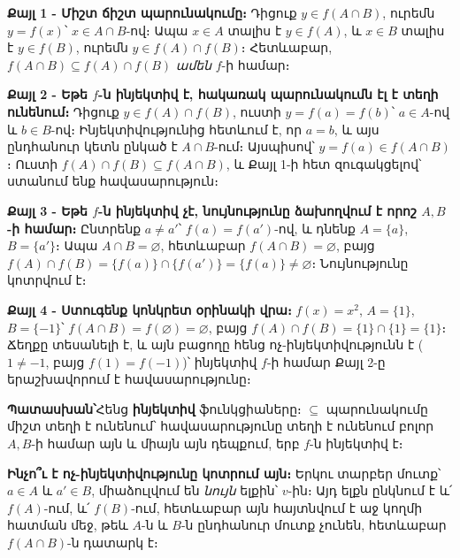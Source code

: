 \documentclass[11pt,a4paper]{article}
\newcommand{\answer}[1]{\begin{answerbox}\centering\textbf{Պատասխան՝}\quad #1\end{answerbox}}
\begin{document}
\textbf{Քայլ 1 - Միշտ ճիշտ պարունակումը։} Դիցուք $y\in f(A\cap B)$, ուրեմն $y=f(x)$՝ $x\in A\cap B$-ով։
Ապա $x\in A$ տալիս է $y\in f(A)$, և $x\in B$ տալիս է $y\in f(B)$, ուրեմն $y\in f(A)\cap f(B)$։
Հետևաբար, $f(A\cap B)\subseteq f(A)\cap f(B)$ \emph{ամեն} $f$-ի համար։

\textbf{Քայլ 2 - Եթե $f$-ն ինյեկտիվ է, հակառակ պարունակումն էլ է տեղի ունենում։} Դիցուք $y\in f(A)\cap f(B)$, ուստի
$y=f(a)=f(b)$՝ $a\in A$-ով և $b\in B$-ով։ Ինյեկտիվությունից հետևում է, որ $a=b$, և այս ընդհանուր կետն
ընկած է $A\cap B$-ում։ Այսպիսով՝ $y=f(a)\in f(A\cap B)$։ Ուստի $f(A)\cap f(B)\subseteq f(A\cap B)$, և
Քայլ 1-ի հետ զուգակցելով՝ ստանում ենք հավասարություն։

\textbf{Քայլ 3 - Եթե $f$-ն ինյեկտիվ չէ, նույնությունը ձախողվում է որոշ $A,B$-ի համար։} Ընտրենք $a\ne a'$՝
$f(a)=f(a')$-ով, և դնենք $A=\{a\}$, $B=\{a'\}$։ Ապա $A\cap B=\varnothing$, հետևաբար $f(A\cap B)=\varnothing$,
բայց $f(A)\cap f(B)=\{f(a)\}\cap\{f(a')\}=\{f(a)\}\ne\varnothing$։ Նույնությունը կոտրվում է։

\textbf{Քայլ 4 - Ստուգենք կոնկրետ օրինակի վրա։} $f(x)=x^2$, $A=\{1\}$, $B=\{-1\}$՝
$f(A\cap B)=f(\varnothing)=\varnothing$, բայց $f(A)\cap f(B)=\{1\}\cap\{1\}=\{1\}$։ Ճեղքը
տեսանելի է, և այն բացողը հենց ոչ-ինյեկտիվությունն է ($1\neq-1$, բայց $f(1)=f(-1)$)՝ ինյեկտիվ
$f$-ի համար Քայլ 2-ը երաշխավորում է հավասարությունը։

\answer{Հենց \textbf{ինյեկտիվ} ֆունկցիաները։ $\subseteq$ պարունակումը միշտ տեղի է ունենում՝
հավասարությունը տեղի է ունենում բոլոր $A,B$-ի համար այն և միայն այն դեպքում, երբ $f$-ն ինյեկտիվ է։}

\medskip
\textbf{Ինչո՞ւ է ոչ-ինյեկտիվությունը կոտրում այն։} Երկու տարբեր մուտք՝ $a\in A$ և $a'\in B$,
միաձուլվում են \emph{նույն} ելքին՝ $v$-ին։ Այդ ելքն ընկնում է և՛ $f(A)$-ում, և՛ $f(B)$-ում, հետևաբար այն
հայտնվում է աջ կողմի հատման մեջ, թեև $A$-ն և $B$-ն ընդհանուր մուտք չունեն, հետևաբար $f(A\cap B)$-ն
դատարկ է։

\begin{center}
\end{center}
\end{document}
